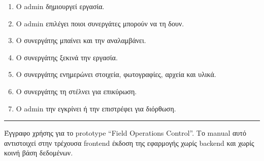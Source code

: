 \documentclass[11pt,a4paper]{article}
\begin{document}
\begin{enumerate}
  \item Ο admin δημιουργεί εργασία.
  \item Ο admin επιλέγει ποιοι συνεργάτες μπορούν να τη δουν.
  \item Ο συνεργάτης μπαίνει και την αναλαμβάνει.
  \item Ο συνεργάτης ξεκινά την εργασία.
  \item Ο συνεργάτης ενημερώνει στοιχεία, φωτογραφίες, αρχεία και υλικά.
  \item Ο συνεργάτης τη στέλνει για επικύρωση.
  \item Ο admin την εγκρίνει ή την επιστρέφει για διόρθωση.
\end{enumerate}

\vspace{1em}
\hrule
\vspace{0.6em}

{\small\textcolor{soft}{Έγγραφο χρήσης για το prototype “Field Operations Control”. Το manual αυτό αντιστοιχεί στην τρέχουσα frontend έκδοση της εφαρμογής χωρίς backend και χωρίς κοινή βάση δεδομένων.}}
\end{document}
